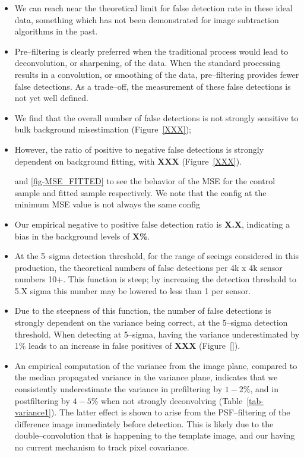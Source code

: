 \documentclass[prd, nofootinbib, floatfix, 11pt,tightenlines,times]{article}
\begin{document}
\begin{itemize}

\item We can reach near the theoretical limit for false detection rate
  in these ideal data, something which has not been demonstrated for
  image subtraction algorithms in the past.

\item Pre--filtering is clearly preferred when the traditional process
  would lead to deconvolution, or sharpening, of the data.  When the
  standard processing results in a convolution, or smoothing of the
  data, pre--filtering provides fewer false detections.  As a
  trade--off, the measurement of these false detections is not yet
  well defined.

\item We find that the overall number of false detections is not
  strongly sensitive to bulk background misestimation
  (Figure~\ref{XXX});

\item However, the ratio of positive to negative false detections is
  strongly dependent on background fitting, with {\bf XXX}
  (Figure~\ref{XXX}).


and \ref{fig-MSE_FITTED} to see the behavior of the MSE for the control sample and
fitted sample respectively.  We note that the config at the minimum MSE value is
not always the same config\item Our empirical negative to positive false detection ratio is {\bf
  X.X}, indicating a bias in the background levels of {\bf X\%}.

\item At the 5--sigma detection threshold, for the range of seeings
  considered in this production, the theoretical numbers of false
  detections per 4k x 4k sensor numbers 10+.  This function is steep;
  by increasing the detection threshold to 5.X sigma this number may
  be lowered to less than 1 per sensor.

\item Due to the steepness of this function, the number of false
  detections is strongly dependent on the variance being correct, at
  the 5--sigma detection threshold.  When detecting at 5--sigma,
  having the variance underestimated by 1\% leads to an increase
  in false positives of {\bf XXX} (Figure~\ref{}).

\item An empirical computation of the variance from the image plane,
  compared to the median propagated variance in the variance plane,
  indicates that we consistently underestimate the variance in
  prefiltering by $1-2\%$, and in postfiltering by $4-5\%$ when not
  strongly deconvolving (Table~\ref{tab-variance1}).  The latter
  effect is shown to arise from the PSF--filtering of the difference
  image immediately before detection.  This is likely due to the
  double--convolution that is happening to the template image, and our
  having no current mechanism to track pixel covariance.


\end{itemize}
\end{document}
